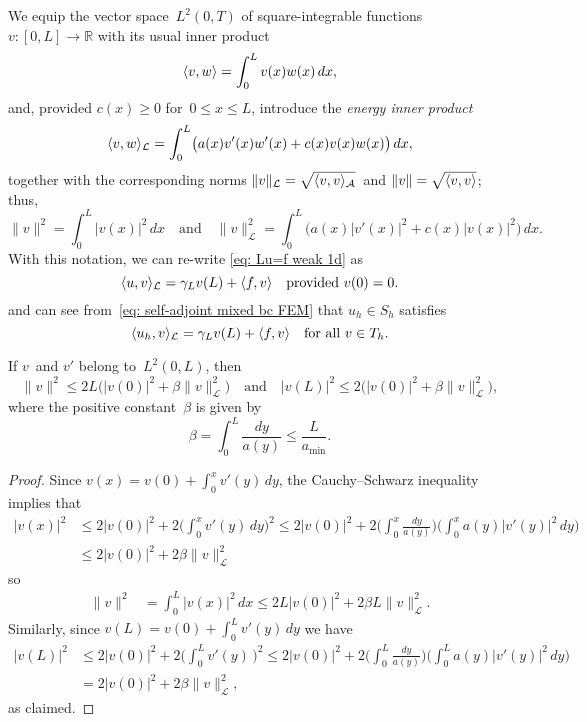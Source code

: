 We equip the vector space~$L^2(0,T)$ of square-integrable 
functions~$v:[0,L]\to\mathbb{R}$ with its usual inner product
\[
\langle v,w\rangle=\int_0^Lv(x)w(x)\,dx,
\]
and, provided $c(x)\ge0$ for~$0\le x\le L$, introduce the \emph{energy
inner product}
\begin{equation}\label{eq: energy iprod}
\langle v,w\rangle_{\mathcal{L}}=\int_0^L\bigl(a(x)v'(x)w'(x)+c(x)v(x)w(x)\bigr)\,dx,
\end{equation}
together with the corresponding norms
$\|v\|_{\mathcal{L}}=\sqrt{\langle v,v\rangle_{\mathcal{A}}}$~and
$\|v\|=\sqrt{\langle v,v\rangle}$; thus,
\[
\|v\|^2=\int_0^L|v(x)|^2\,dx
\quad\text{and}\quad
\|v\|_{\mathcal{L}}^2=\int_0^L\bigl(a(x)|v'(x)|^2+c(x)|v(x)|^2\bigr)\,dx.
\]
With this notation, we can re-write \eqref{eq: Lu=f weak 1d} as
\begin{equation}\label{eq: <u,v>A}
\langle u,v\rangle_{\mathcal{L}}=\gamma_Lv(L)+\langle f,v\rangle\quad\text{provided $v(0)=0$.}
\end{equation}
and can see from~\eqref{eq: self-adjoint mixed bc FEM} that $u_h\in S_h$
satisfies
\begin{equation}\label{eq: <uh,v>A}
\langle u_h,v\rangle_{\mathcal{L}}=\gamma_Lv(L)+\langle f,v\rangle
	\quad\text{for all $v\in T_h$.}
\end{equation}

\begin{lemma}\label{lem: v v'}
If $v$~and $v'$ belong to~$L^2(0,L)$, then
\[
\|v\|^2\le2L\bigl(|v(0)|^2+\beta\|v\|_{\mathcal{L}}^2\bigr)
\quad\text{and}\quad
|v(L)|^2\le 2\bigl(|v(0)|^2+\beta\|v\|_{\mathcal{L}}^2\bigr),
\]
where the positive constant~$\beta$ is given by
\[
\beta=\int_0^L\frac{dy}{a(y)}\le\frac{L}{a_{\min}}.
\]
\end{lemma}
\begin{proof}
Since $v(x)=v(0)+\int_0^xv'(y)\,dy$, the Cauchy--Schwarz inequality implies that
\begin{align*}
|v(x)|^2&\le2|v(0)|^2+2\biggl(\int_0^x v'(y)\,dy\biggr)^2
\le2|v(0)|^2+2\biggl(\int_0^x\frac{dy}{a(y)}\biggr)
\biggl(\int_0^xa(y)|v'(y)|^2\,dy\biggr)\\
	&\le2|v(0)|^2+2\beta\|v\|_{\mathcal{L}}^2
\end{align*}
so
\begin{align*}
\|v\|^2&=\int_0^L|v(x)|^2\,dx\le 2L|v(0)|^2+2\beta L\|v\|_{\mathcal{L}}^2.
\end{align*}
Similarly, since $v(L)=v(0)+\int_0^Lv'(y)\,dy$ we have
\begin{align*}
|v(L)|^2&\le2|v(0)|^2+2\biggl(\int_0^Lv'(y)\,\biggr)^2
	\le2|v(0)|^2+2\biggl(\int_0^L\frac{dy}{a(y)}\biggr)
	\biggl(\int_0^La(y)|v'(y)|^2\,dy\biggr)\\
	&=2|v(0)|^2+2\beta\|v\|_{\mathcal{L}}^2,
\end{align*}
as claimed.
\end{proof}


